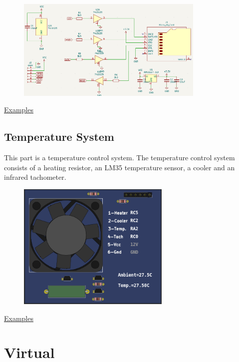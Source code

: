 \begin{figure}[H]
\center
\includegraphics[width=0.8\textwidth]{img/part_sdcard_.png} 
\end{figure} 


\href{https://lcgamboa.github.io/picsimlab_examples/parts_SD_Card.html}{Examples}


\subsection{Temperature System}

This part is a temperature control system. 
The temperature control system consists of a heating resistor, an LM35 temperature sensor, 
a cooler and an infrared tachometer.


\begin{figure}[H]
\center
\includegraphics[width=0.65\textwidth]{img/part_tempsys.png} 
\end{figure}

\href{https://lcgamboa.github.io/picsimlab_examples/parts_Temperature_System.html}{Examples}

\section{Virtual}

